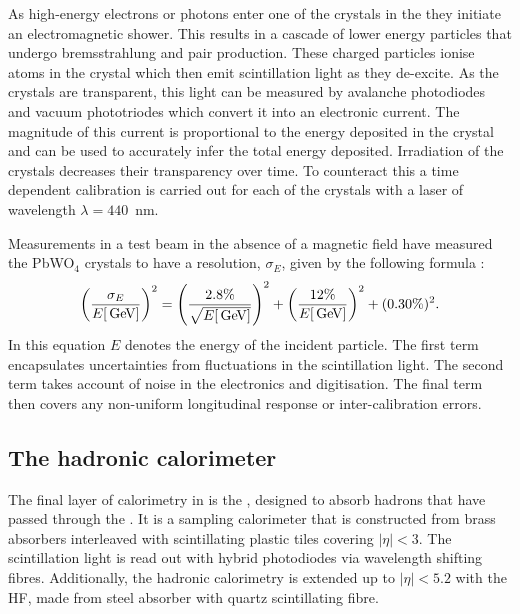 As high-energy electrons or photons enter one of the crystals in the
\ECAL they initiate an electromagnetic shower. This results in a
cascade of lower energy particles that undergo bremsstrahlung and pair
production.  These charged particles ionise atoms in the crystal which
then emit scintillation light as they de-excite. As the crystals are
transparent, this light can be measured by avalanche photodiodes and
vacuum phototriodes which convert it into an electronic current. The
magnitude of this current is proportional to the energy deposited in
the crystal and can be used to accurately infer the total energy
deposited. Irradiation of the crystals decreases their transparency
over time. To counteract this a time dependent calibration is carried
out for each of the crystals with a laser of wavelength
$\lambda=440$~nm. 

Measurements in a test beam in the absence of a magnetic field have
measured the PbWO$_4$ crystals to have a resolution, $\sigma_E$, given
by the following formula \cite{1748-0221-2-04-P04004}:
\begin{equation} \label{eq:ecalres}
\left(\frac{\sigma_E}{E[\mathrm{\,Ge\kern -0.1em V}]}\right)^2=\left(\frac{2.8\%}
{\sqrt{E[\mathrm{\,Ge\kern -0.1em V}]}}\right)^2+\left(\frac{12\%}{E[\mathrm{\,Ge\kern -0.1em V}]}\right)^2+(0.30\%)^2.
\end{equation} 
In this equation $E$ denotes the energy of the incident
particle. The first term encapsulates uncertainties from fluctuations in the
scintillation light. The second term takes account of noise in the
electronics and digitisation. The final term then covers any
non-uniform longitudinal response or inter-calibration errors. 

\subsection{The hadronic calorimeter} 
\label{sec:hcal}

The final layer of calorimetry in \CMS is the \HCAL \cite{CMS:HCAL},
designed to absorb hadrons that have passed through the \ECAL.
It is a sampling calorimeter that is constructed from brass absorbers
interleaved with scintillating plastic tiles covering $|\eta|<3$. The
scintillation light is read out with hybrid photodiodes via wavelength
shifting fibres.  Additionally, the hadronic calorimetry is extended
up to $|\eta|<5.2$ with the \ac{HF}, made from steel absorber with
quartz scintillating fibre. 

